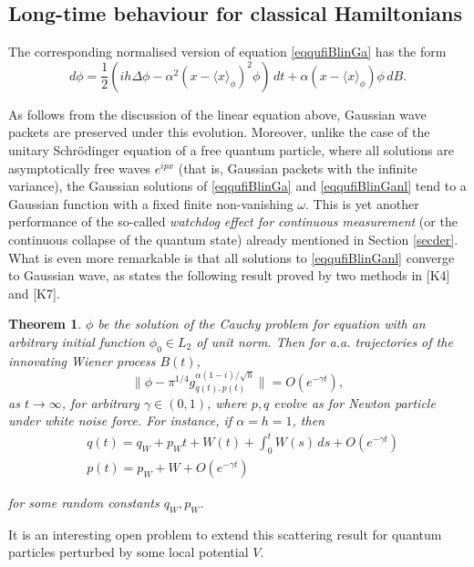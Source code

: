 \documentclass[12pt]{article}
\def\al{\alpha}
\newtheorem{theorem}{Theorem}[section]
\begin{document}
\subsection{Long-time behaviour for classical Hamiltonians}

The corresponding normalised version of  equation \eqref{eqqufiBlinGa} has the form
 \begin{equation}
\label{eqqufiBlinGanl}
d\phi=\frac12 \left(i h\Delta \phi
-\al^2(x-\langle x \rangle _{\phi})^2\phi\right)\, dt
+\al (x-\langle x \rangle _{\phi})\phi \, dB.
\end{equation}

As follows from the discussion of the linear equation above, Gaussian wave packets are
preserved under this evolution. Moreover, unlike the case of the unitary Schr\"odinger equation of a free
quantum particle, where all solutions are asymptotically free waves
$e^{ipx}$ (that is,
Gaussian packets with the infinite variance), the Gaussian solutions
of \eqref{eqqufiBlinGa} and \eqref{eqqufiBlinGanl} tend to a Gaussian function
with a fixed finite non-vanishing $\omega$. This is yet another performance of the so-called
{\it watchdog effect for continuous measurement} (or the continuous collapse of the quantum state)
already mentioned in Section \ref{secder}.
What is even more remarkable is that all solutions to \eqref{eqqufiBlinGanl} converge to Gaussian wave,
as states the following result proved by two methods in [K4] and [K7].

\begin{theorem}
\label{thscattering}
 $\phi$ be the solution of the Cauchy
problem for equation  with an
arbitrary initial function $\phi_0 \in L_2$ of unit norm. Then for a.a. trajectories of the
innovating Wiener process $B(t)$,
\[
\| \phi -\pi^{1/4}g^{\al(1-i)/\sqrt h}_{q(t),p(t)} \| =O(e^{-\gamma t}),
\]
as $t \to \infty$, for arbitrary $\gamma \in (0,1)$, where $p,q$ evolve as
for Newton particle under white noise force. For instance, if $\al=h=1$, then
\[
\begin{aligned}
& q(t)=q_W+p_Wt+W(t)+\int_0^tW(s) \, ds +O(e^{-\gamma t}) \\
& p(t)=p_W+W+O(e^{-\gamma t})
\end{aligned}
\]

for some random constants $q_W, p_W$.
\end{theorem}

It is an interesting open problem to extend this scattering result for
quantum particles perturbed by some local potential $V$.
\end{document}
